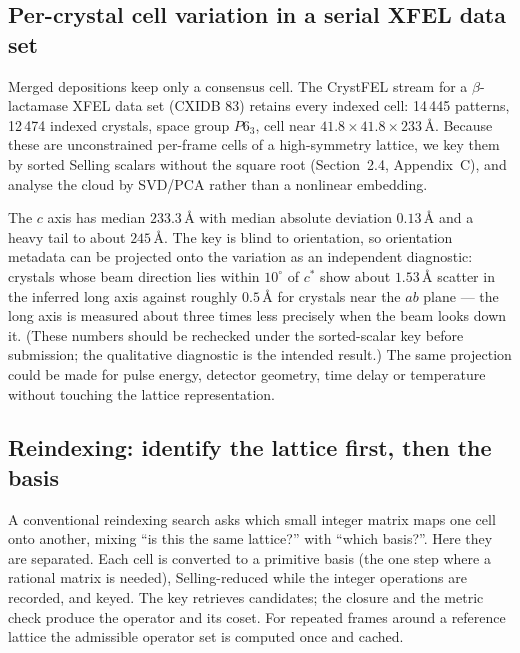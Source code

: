 \documentclass[11pt]{article}
\newcommand{\Ang}{\text{\AA}}
\begin{document}
\subsection{Per-crystal cell variation in a serial XFEL data set}

Merged depositions keep only a consensus cell. The CrystFEL stream for a $\beta$-lactamase XFEL data set (CXIDB 83) retains every indexed cell: 14\,445 patterns, 12\,474 indexed crystals, space group $P6_3$, cell near $41.8\times41.8\times233\,\Ang$. Because these are unconstrained per-frame cells of a high-symmetry lattice, we key them by sorted Selling scalars without the square root (Section~2.4, Appendix~C), and analyse the cloud by SVD/PCA rather than a nonlinear embedding.

The $c$ axis has median $233.3\,\Ang$ with median absolute deviation $0.13\,\Ang$ and a heavy tail to about $245\,\Ang$. The key is blind to orientation, so orientation metadata can be projected onto the variation as an independent diagnostic: crystals whose beam direction lies within $10^\circ$ of $c^*$ show about $1.53\,\Ang$ scatter in the inferred long axis against roughly $0.5\,\Ang$ for crystals near the $ab$ plane --- the long axis is measured about three times less precisely when the beam looks down it. (These numbers should be rechecked under the sorted-scalar key before submission; the qualitative diagnostic is the intended result.) The same projection could be made for pulse energy, detector geometry, time delay or temperature without touching the lattice representation.


\subsection{Reindexing: identify the lattice first, then the basis}

A conventional reindexing search asks which small integer matrix maps one cell onto another, mixing ``is this the same lattice?'' with ``which basis?''. Here they are separated. Each cell is converted to a primitive basis (the one step where a rational matrix is needed), Selling-reduced while the integer operations are recorded, and keyed. The key retrieves candidates; the closure and the metric check produce the operator and its coset. For repeated frames around a reference lattice the admissible operator set is computed once and cached.
\end{document}
